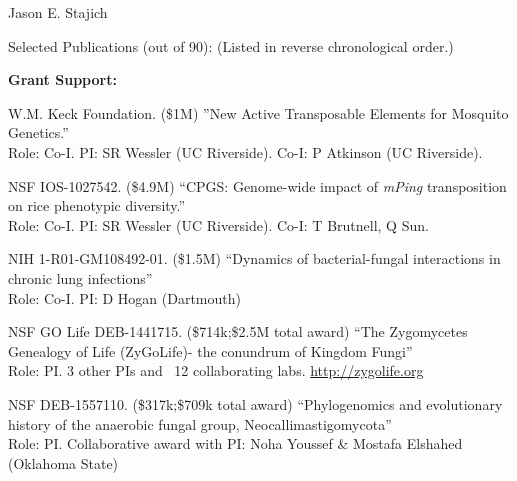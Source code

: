 \documentclass[10pt]{article}
\begin{document}
\begin{cv}{\centerline{Jason E. Stajich}}
\begin{cvlist}{Selected Publications (out of 90): (Listed in reverse chronological order.)}
\end{cvlist}
\setlength{\cvlabelwidth}{24mm}


\begin{cvlistcompact}{\bf Grant Support:}
\item [{\bf Ongoing support}]

\item [2011-2016] W.M. Keck Foundation. (\$1M) ''New Active
  Transposable Elements for Mosquito Genetics.'' \\
Role: Co-I. PI: SR Wessler (UC Riverside). Co-I: P Atkinson (UC Riverside). 

\item [2011-2017] NSF IOS-1027542. (\$4.9M) ``CPGS: Genome-wide impact of \textit{mPing} transposition on rice phenotypic diversity.'' \\
Role: Co-I. PI: SR Wessler (UC Riverside). Co-I: T Brutnell, Q Sun. 

\item [2014-2017] NIH 1-R01-GM108492-01. (\$1.5M) ``Dynamics of bacterial-fungal interactions in chronic lung infections'' \\
Role: Co-I. PI: D Hogan (Dartmouth)

\item [2015-2018] NSF GO Life DEB-1441715. (\$714k;\$2.5M total award) ``The Zygomycetes Genealogy of Life (ZyGoLife)- the conundrum of Kingdom Fungi'' \\
  Role: PI. 3 other PIs and ~12 collaborating labs. \url{http://zygolife.org} 

\item [2016-2019] NSF DEB-1557110. (\$317k;\$709k total award) ``Phylogenomics and evolutionary history of the anaerobic fungal group, Neocallimastigomycota'' \\
Role: PI. Collaborative award with PI: Noha Youssef \& Mostafa Elshahed (Oklahoma State)


\end{cvlistcompact}
\end{cv}
\end{document}
